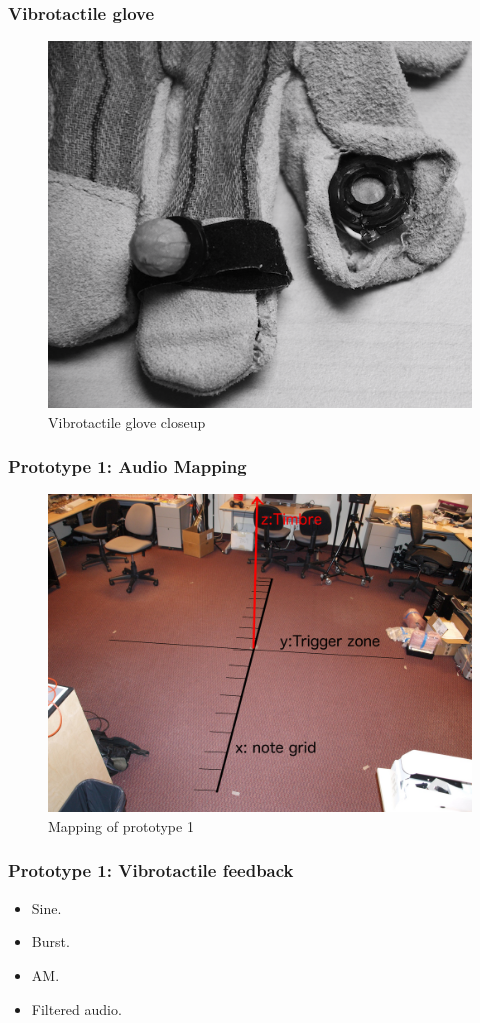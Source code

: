 \documentclass{beamer}
\begin{document}



\begin{frame}
\frametitle{Vibrotactile glove}
	\begin{figure}
		\centering
		\includegraphics[width = .6\textwidth]{figs/ccloseups.png}	
		\caption{Vibrotactile glove closeup}
	\end{figure}
\end{frame}

\begin{frame}%
	\frametitle{Prototype 1: Audio Mapping}
	\begin{figure}
	\includegraphics[width = .9\textwidth]{figs/prototype1_circle.png}
	\caption{Mapping of prototype 1}
	\end{figure}
\end{frame}



\begin{frame}
\frametitle{Prototype 1: Vibrotactile feedback}
	\begin{itemize}[<+->]
	\item Sine. %
	\item Burst. %
	\item AM. %
	\item Filtered audio. %
	\end{itemize}
\end{frame}
\end{document}
